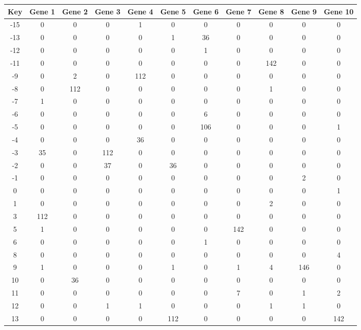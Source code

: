 \begin{tabular}{|c|c|c|c|c|c|c|c|c|c|c|}
\hline
Key & Gene 1 & Gene 2 & Gene 3 & Gene 4 & Gene 5 & Gene 6 & Gene 7 & Gene 8 & Gene 9 & Gene 10 \\
\hline
-15 & 0 & 0 & 0 & 1 & 0 & 0 & 0 & 0 & 0 & 0 \\
-13 & 0 & 0 & 0 & 0 & 1 & 36 & 0 & 0 & 0 & 0 \\
-12 & 0 & 0 & 0 & 0 & 0 & 1 & 0 & 0 & 0 & 0 \\
-11 & 0 & 0 & 0 & 0 & 0 & 0 & 0 & 142 & 0 & 0 \\
-9 & 0 & 2 & 0 & 112 & 0 & 0 & 0 & 0 & 0 & 0 \\
-8 & 0 & 112 & 0 & 0 & 0 & 0 & 0 & 1 & 0 & 0 \\
-7 & 1 & 0 & 0 & 0 & 0 & 0 & 0 & 0 & 0 & 0 \\
-6 & 0 & 0 & 0 & 0 & 0 & 6 & 0 & 0 & 0 & 0 \\
-5 & 0 & 0 & 0 & 0 & 0 & 106 & 0 & 0 & 0 & 1 \\
-4 & 0 & 0 & 0 & 36 & 0 & 0 & 0 & 0 & 0 & 0 \\
-3 & 35 & 0 & 112 & 0 & 0 & 0 & 0 & 0 & 0 & 0 \\
-2 & 0 & 0 & 37 & 0 & 36 & 0 & 0 & 0 & 0 & 0 \\
-1 & 0 & 0 & 0 & 0 & 0 & 0 & 0 & 0 & 2 & 0 \\
0 & 0 & 0 & 0 & 0 & 0 & 0 & 0 & 0 & 0 & 1 \\
1 & 0 & 0 & 0 & 0 & 0 & 0 & 0 & 2 & 0 & 0 \\
3 & 112 & 0 & 0 & 0 & 0 & 0 & 0 & 0 & 0 & 0 \\
5 & 1 & 0 & 0 & 0 & 0 & 0 & 142 & 0 & 0 & 0 \\
6 & 0 & 0 & 0 & 0 & 0 & 1 & 0 & 0 & 0 & 0 \\
8 & 0 & 0 & 0 & 0 & 0 & 0 & 0 & 0 & 0 & 4 \\
9 & 1 & 0 & 0 & 0 & 1 & 0 & 1 & 4 & 146 & 0 \\
10 & 0 & 36 & 0 & 0 & 0 & 0 & 0 & 0 & 0 & 0 \\
11 & 0 & 0 & 0 & 0 & 0 & 0 & 7 & 0 & 1 & 2 \\
12 & 0 & 0 & 1 & 1 & 0 & 0 & 0 & 1 & 1 & 0 \\
13 & 0 & 0 & 0 & 0 & 112 & 0 & 0 & 0 & 0 & 142 \\
\hline
\end{tabular}